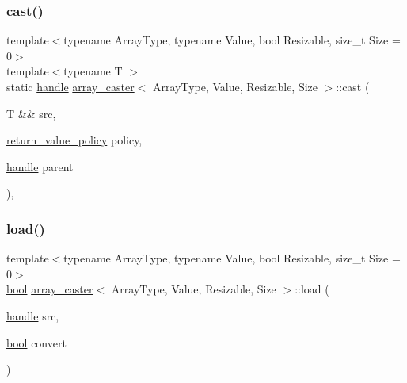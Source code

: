 \subsubsection{\texorpdfstring{cast()}{cast()}}
{\footnotesize\ttfamily template$<$typename Array\+Type, typename Value, bool Resizable, size\+\_\+t Size = 0$>$ \\
template$<$typename T $>$ \\
static \mbox{\hyperlink{classhandle}{handle}} \mbox{\hyperlink{structarray__caster}{array\+\_\+caster}}$<$ Array\+Type, Value, Resizable, Size $>$\+::cast (\begin{DoxyParamCaption}\item[{T \&\&}]{src,  }\item[{\mbox{\hyperlink{detail_2common_8h_adde72ab1fb0dd4b48a5232c349a53841}{return\+\_\+value\+\_\+policy}}}]{policy,  }\item[{\mbox{\hyperlink{classhandle}{handle}}}]{parent }\end{DoxyParamCaption})\hspace{0.3cm}{\ttfamily [inline]}, {\ttfamily [static]}}

\mbox{\label{structarray__caster_ad0d8f8e2a90d20917e3496f8aeea6d8b}} 
\subsubsection{\texorpdfstring{load()}{load()}}
{\footnotesize\ttfamily template$<$typename Array\+Type, typename Value, bool Resizable, size\+\_\+t Size = 0$>$ \\
\mbox{\hyperlink{asdl_8h_af6a258d8f3ee5206d682d799316314b1}{bool}} \mbox{\hyperlink{structarray__caster}{array\+\_\+caster}}$<$ Array\+Type, Value, Resizable, Size $>$\+::load (\begin{DoxyParamCaption}\item[{\mbox{\hyperlink{classhandle}{handle}}}]{src,  }\item[{\mbox{\hyperlink{asdl_8h_af6a258d8f3ee5206d682d799316314b1}{bool}}}]{convert }\end{DoxyParamCaption})\hspace{0.3cm}{\ttfamily [inline]}}

\mbox{\label{structarray__caster_a0c14bf91b3fea20a11f5c086a1a04fa0}} 
